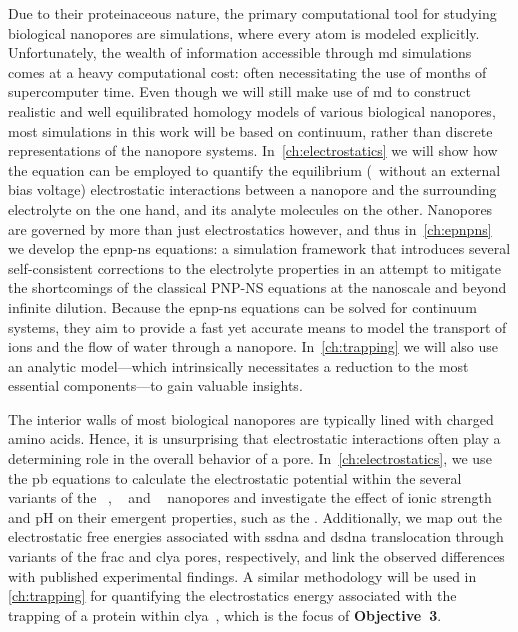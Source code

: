 Due to their proteinaceous nature, the primary computational tool for studying biological nanopores are
 simulations, where every atom is modeled explicitly. Unfortunately, the wealth of information
accessible through \gls{md} simulations comes at a heavy computational cost: often necessitating the use of
months of supercomputer time. Even though we will still make use of \gls{md} to construct realistic and well
equilibrated homology models of various biological nanopores, most simulations in this work will be based on
continuum, rather than discrete representations of the nanopore systems. In~\cref{ch:electrostatics} we will
show how the  equation can be employed to quantify the equilibrium (\ie~without an external bias
voltage) electrostatic interactions between a nanopore and the surrounding electrolyte on the one hand, and
its analyte molecules on the other. Nanopores are governed by more than just electrostatics however, and thus
in~\cref{ch:epnpns} we develop the \gls{epnp-ns} equations: a simulation framework that introduces several
self-consistent corrections to the electrolyte properties in an attempt to mitigate the shortcomings of the
classical {PNP-NS} equations at the nanoscale and beyond infinite dilution. Because the \gls{epnp-ns}
equations can be solved for continuum systems, they aim to provide a fast yet accurate means to model the
transport of ions and the flow of water through a nanopore. In~\cref{ch:trapping} we will also use an analytic
model---which intrinsically necessitates a reduction to the most essential components---to gain valuable
insights.

%
%

The interior walls of most biological nanopores are typically lined with charged amino acids. Hence, it is
unsurprising that electrostatic interactions often play a determining role in the overall behavior of a pore.
In~\cref{ch:electrostatics}, we use the \gls{pb} equations to calculate the electrostatic potential within the
several variants of the ~\cite{Huang-2020}, ~\cite{Wloka-2016,Huang-2017} and
~\cite{Franceschini-2016} nanopores and investigate the effect of ionic strength and pH on
their emergent properties, such as the . Additionally, we map out the electrostatic free
energies associated with \gls{ssdna} and \gls{dsdna} translocation through variants of the \gls{frac} and
\gls{clya} pores, respectively, and link the observed differences with published experimental findings. A
similar methodology will be used in \cref{ch:trapping} for quantifying the electrostatics energy associated
with the trapping of a protein within \gls{clya}~\cite{Soskine-Biesemans-2015}, which is the focus of
\textbf{Objective~3}.

